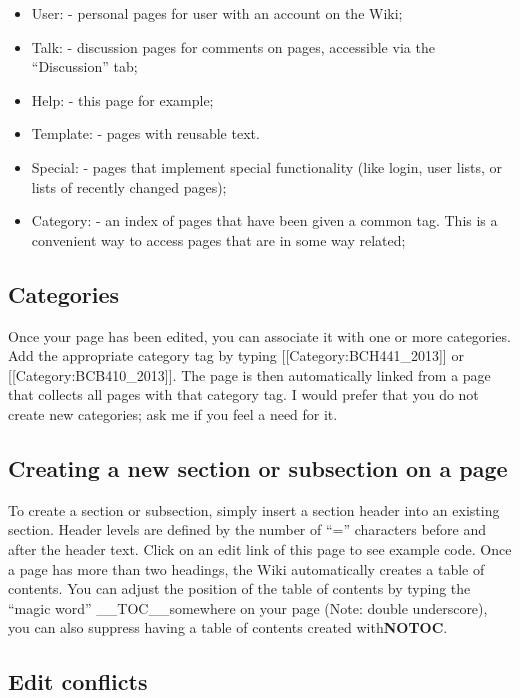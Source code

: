\documentclass[]{book}
\providecommand{\tightlist}{%
  \setlength{\itemsep}{0pt}\setlength{\parskip}{0pt}}
\begin{document}
\begin{itemize}
\tightlist
\item
  User: - personal pages for user with an account on the Wiki;
\item
  Talk: - discussion pages for comments on pages, accessible via the
  ``Discussion'' tab;
\item
  Help: - this page for example;
\item
  Template: - pages with reusable text.
\item
  Special: - pages that implement special functionality (like login,
  user lists, or lists of recently changed pages);
\item
  Category: - an index of pages that have been given a common tag. This
  is a convenient way to access pages that are in some way related;
\end{itemize}

\subsection{Categories}\label{categories}

Once your page has been edited, you can associate it with one or more
categories. Add the appropriate category tag by typing
{[}{[}Category:BCH441\_2013{]}{]} or {[}{[}Category:BCB410\_2013{]}{]}.
The page is then automatically linked from a page that collects all
pages with that category tag. I would prefer that you do not create new
categories; ask me if you feel a need for it.

\subsection{Creating a new section or subsection on a
page}\label{creating-a-new-section-or-subsection-on-a-page}

To create a section or subsection, simply insert a section header into
an existing section. Header levels are defined by the number of ``=''
characters before and after the header text. Click on an edit link of
this page to see example code. Once a page has more than two headings,
the Wiki automatically creates a table of contents. You can adjust the
position of the table of contents by typing the ``magic word''
\_\_TOC\_\_somewhere on your page (Note: double underscore), you can
also suppress having a table of contents created with\textbf{NOTOC}.

\subsection{Edit conflicts}\label{edit-conflicts}
\end{document}
